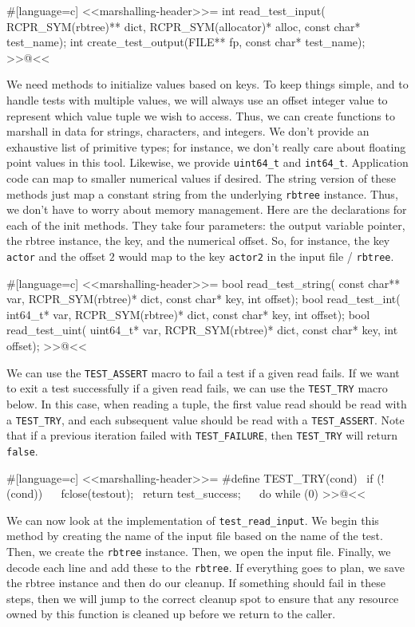 {#[language=c]
<<marshalling-header>>=
int read_test_input(
    RCPR_SYM(rbtree)** dict, RCPR_SYM(allocator)* alloc, const char* test_name);
int create_test_output(FILE** fp, const char* test_name);
>>@<<

We need methods to initialize values based on keys. To keep things simple, and
to handle tests with multiple values, we will always use an offset integer value
to represent which value tuple we wish to access.  Thus, we can create functions
to marshall in data for strings, characters, and integers.  We don't provide an
exhaustive list of primitive types; for instance, we don't really care about
floating point values in this tool.  Likewise, we provide \verb/uint64_t/ and
\verb/int64_t/. Application code can map to smaller numerical values if desired.
The string version of these methods just map a constant string from the
underlying \verb/rbtree/ instance. Thus, we don't have to worry about memory
management.  Here are the declarations for each of the init methods.  They take
four parameters: the output variable pointer, the rbtree instance, the key, and
the numerical offset.  So, for instance, the key \verb/actor/ and the offset $2$
would map to the key \verb/actor2/ in the input file / \verb/rbtree/.

#[language=c]
<<marshalling-header>>=
bool read_test_string(
    const char** var, RCPR_SYM(rbtree)* dict, const char* key, int offset);
bool read_test_int(
    int64_t* var, RCPR_SYM(rbtree)* dict, const char* key, int offset);
bool read_test_uint(
    uint64_t* var, RCPR_SYM(rbtree)* dict, const char* key, int offset);
>>@<<

We can use the \verb/TEST_ASSERT/ macro to fail a test if a given read fails. If
we want to exit a test successfully if a given read fails, we can use the
\verb/TEST_TRY/ macro below.  In this case, when reading a tuple, the first
value read should be read with a \verb/TEST_TRY/, and each subsequent value
should be read with a \verb/TEST_ASSERT/. Note that if a previous iteration
failed with \verb/TEST_FAILURE/, then \verb/TEST_TRY/ will return \verb/false/.

#[language=c]
<<marshalling-header>>=
#define TEST_TRY(cond) \
    if (!(cond)) \
    { \
        fclose(testout); \
        return test_success; \
    } \
    do { } while (0)
>>@<<

We can now look at the implementation of \verb/test_read_input/. We begin this
method by creating the name of the input file based on the name of the test.
Then, we create the \verb/rbtree/ instance. Then, we open the input file.
Finally, we decode each line and add these to the \verb/rbtree/. If everything
goes to plan, we save the rbtree instance and then do our cleanup. If something
should fail in these steps, then we will jump to the correct cleanup spot to
ensure that any resource owned by this function is cleaned up before we return
to the caller.

}
